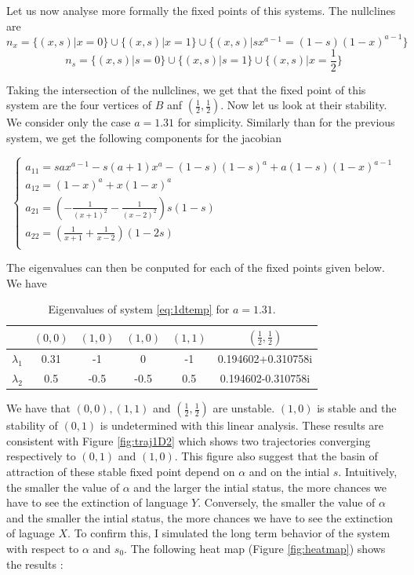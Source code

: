 \documentclass{article}
\begin{document}
Let us now analyse more formally the fixed points of this systems.
The nullclines are
$$n_x = \{(x,s) | x=0 \} \cup \{ (x,s)| x = 1 \} \cup \{ (x,s) | sx^{a-1} = (1-s)(1-x)^{a-1} \}$$
$$n_s = \{(x,s) | s=0 \} \cup \{ (x,s)| s = 1 \} \cup \{ (x,s) | x= \frac{1}{2} \}$$

Taking the intersection of the nullclines, we get that the fixed point of this system are the four vertices of $B$ anf $(\frac{1}{2}, \frac{1}{2})$.
Now let us look at their stability.
We consider only the case $a=1.31$ for simplicity.
Similarly than for the previous system, we get the following components for the jacobian

\[
\begin{cases}
a_{11} = sax^{a-1} - s(a+1)x^a - (1-s)(1-s)^a + a(1-s)(1-x)^{a-1} \\
a_{12} = (1-x)^a + x(1-x)^a \\
a_{21} = (-\frac{1}{(x+1)^2}-\frac{1}{(x-2)^2})s(1-s) \\
a_{22} = (\frac{1}{x+1}+\frac{1}{x-2})(1-2s) \\
\end{cases}
\]

The eigenvalues can then be conputed for each of the fixed points given below.
We have
\begin{table}[h]
  \centering
  \begin{tabular}{cccccc}
    & $(0,0)$ & $(1,0)$ & $(1,0)$ & $(1,1)$ & $(\frac{1}{2}, \frac{1}{2})$ \\
    \hline
    $\lambda_1$ & 0.31 & -1 & 0 & -1 & 0.194602+0.310758i \\
    \hline
    $\lambda_2$ & 0.5 & -0.5 & -0.5 & 0.5 & 0.194602-0.310758i \\
    \hline
  \end{tabular}
  \caption{Eigenvalues of system \ref{eq:1dtemp} for $a=1.31$.}
  \label{tab:eig}
\end{table}

We have that $(0,0), (1,1)$ and $(\frac{1}{2}, \frac{1}{2})$ are unstable. $(1,0)$ is stable and the stability of $(0,1)$ is undetermined with this linear analysis.
These results are consistent with Figure \ref{fig:traj1D2} which shows two trajectories converging respectively to $(0,1)$ and $(1,0)$.
This figure also suggest that the basin of attraction of these stable fixed point depend on $\alpha$ and on the intial $s$.
Intuitively, the smaller the value of $\alpha$ and the larger the intial status, the more chances we have to see the extinction of language $Y$.
Conversely, the smaller the value of $\alpha$ and the smaller the intial status, the more chances we have to see the extinction of laguage $X$.
To confirm this, I simulated the long term behavior of the system with respect to $\alpha$ and $s_0$.
The following heat map (Figure \ref{fig:heatmap}) shows the results :
\end{document}
